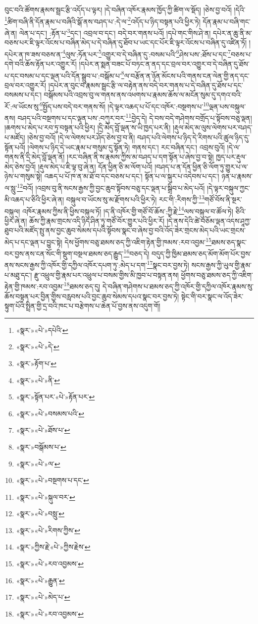 བུང་བའི་ཚོགས་རྣམས་སྦྲང་རྩི་འདོད་པ་ལྟར། །དེ་བཞིན་འཁོར་རྣམས་ཁྱོད་ཀྱི་ཚིག་ལ་སྡོད། །ཅེས་བྱ་བའོ། །དེའི་\footnote{«སྣར་»«པེ་»དཔེའི་}ཚིག་བཞི་ནི་དོན་རྣམ་པ་བཞིའི་སྒོ་ནས་བཤད་པ་:དེ་ལ་\footnote{«སྣར་»«པེ་»དེ་}འདོད་པ་ཉིད་བསྟན་པའི་ཕྱིར་ཏེ། དོན་རྣམ་པ་བཞི་གང་ཞེ་ན། ལེན་པ་དང་། :རྟོན་པ་\footnote{«སྣར་»རྟོག་པ་}དང་། འབྲལ་བ་དང་། བདེ་བར་གནས་པའོ། །དཔེ་གང་གིས་ཤེ་ན། དཔེར་ན་ཆུ་ནི་མ་བཅས་པར་ཇི་ལྟར་འོངས་པ་བཞིན་མེད་པ་དེ་བཞིན་དུ་ཐོབ་པ་ཡང་དང་པོར་ཇི་ལྟར་འོངས་པ་བཞིན་དུ་འཛིན་ཏོ། །དཔེར་ན་ཁ་ཟས་བཅས་ན་\footnote{«སྣར་»«པེ་»ནི་}ལུས་:ཏོན་པར་\footnote{«སྣར་»སྟོན་པར་«པེ་»རྟོན་པར་}འགྱུར་བ་དེ་བཞིན་དུ་:བསམ་པའི་\footnote{«སྣར་»«པེ་»བསམས་པའི་}ཤེས་པས་:ཐོས་པ་དང་\footnote{«སྣར་»«པེ་»ཐོས་པ་}བཅས་པ་དགེ་བའི་ཆོས་རྟོན་པར་འགྱུར་རོ། །དཔེར་ན་སྨན་བཟང་པོ་བཏང་ན་ནད་དང་བྲལ་བར་འགྱུར་བ་དེ་བཞིན་དུ་ཐོས་པ་དང་བསམ་པ་དང་ལྡན་པའི་དོན་སྒྲུབ་པ་:བསྒོམ་པ་\footnote{«སྣར་»བསྒོམས་པ་}ལ་བརྩོན་ན་ཉོན་མོངས་པའི་གནས་ངན་ལེན་གྱི་ནད་དང་བྲལ་བར་འགྱུར་རོ། །དཔེར་ན་བུང་བ་རྣམས་སྦྲང་རྩི་ལ་བརྟེན་ནས་བདེ་བར་གནས་པ་དེ་བཞིན་དུ་ཐོས་པ་དང་བསམས་པ་དང་། བསྒོམས་པའི་འབྲས་བུ་ལ་གནས་ནས་འཕགས་པ་རྣམས་ཆོས་ལ་མངོན་སུམ་དུ་དགའ་བའི་རོ་:ལ་ཡོངས་སུ་\footnote{«སྣར་»«པེ་»ལ་}སྤྱོད་པས་བདེ་བར་གནས་སོ། །དེ་ལྟར་འཆད་པ་པོ་དང་འཁོར་:བསྔགས་པ་\footnote{«སྣར་»«པེ་»བསྔགས་པ་དང་}ལྡན་པས་བསྐུལ་ནས། བཤད་པའི་བསྔགས་པ་དང་ལྡན་པས་:བཀུར་བར་\footnote{«སྣར་»«པེ་»སྐུལ་བར་}བྱེད་དེ། དེ་བས་བདེ་གཤེགས་བགྲོད་པ་སྟོབས་བཅུ་ལྡན། །ཆགས་པ་མེད་པ་རབ་ཏུ་བསྟན་པའི་ཕྱིར། །དྲི་མེད་བློ་ལྡན་ས་ཡི་ཁྱད་པར་ནི། །རྡུལ་མེད་མ་ལུས་ལེགས་པར་བཤད་པ་མཛོད། །ཅེས་བྱ་བའོ། །དེ་ལ་ལེགས་པར་ཤོད་ཅེས་བྱ་བ་ནི། བཤད་པའི་ལེགས་པ་ཉིད་དེ་རིགས་པའི་ཚུལ་ཉིད་དུ་སྟོན་པའོ། །ལེགས་པ་ཉིད་དེ་ཡང་རྣམ་པ་གསུམ་དུ་སྟོན་ཏེ། གནས་དང་། རང་བཞིན་དང་། འབྲས་བུའོ། །དེ་ལ་གནས་ནི་དྲི་མེད་བློ་ལྡན་ནོ། །རང་བཞིན་ནི་ས་རྣམས་ཀྱིས་མ་བཤད་པ་དག་སྟོན་པ་ཞེས་བྱ་བ་སྟེ། ཁྱད་པར་རྡུལ་མེད་ཅེས་བྱའོ། །རྡུལ་མེད་པ་ཇི་ལྟ་བུ་ཞེ་ན། དོན་ཕྱིན་ཅི་མ་ལོག་པའོ། །བཤད་པ་ན་དོན་ཕྱིན་ཅི་ལོག་ཏུ་གྱུར་པ་ལ་ཉེས་པ་གསུམ་སྟེ། འཆད་པ་པོ་ཁ་ན་མ་ཐོ་བ་དང་བཅས་པ་དང་། སྟོན་པ་ལ་སྐུར་པ་འདེབས་པ་དང་། ཉན་པ་རྣམས་ལ་སླུ་\footnote{«སྣར་»«པེ་»བསླུ་}བའོ། །འབྲས་བུ་ནི་སངས་རྒྱས་ཀྱི་བྱང་ཆུབ་སྟོབས་བཅུ་དང་ལྡན་པ་སྒྲིབ་པ་མེད་པའོ། །དེ་ལྟར་བསྐུལ་ཀྱང་མི་འཆད་པ་ཅིའི་ཕྱིར་ཞེ་ན། བསྐུལ་བ་ཡོངས་སུ་མ་རྫོགས་པའི་ཕྱིར་ཏེ། རང་གི་:རིགས་ཀྱི་\footnote{«སྣར་»«པེ་»རིགས་ཀྱིས་}གཙོ་བོས་ནི་སྔར་བསྐུལ། འཁོར་རྣམས་ཀྱིས་ནི་ཕྱིས་བསྐུལ་ཏོ། །ད་ནི་འཁོར་གྱི་གཙོ་བོ་ཆོས་:ཀྱི་རྗེ་\footnote{«སྣར་»ཀྱིས་རྗེ་«པེ་»ཀྱིས་རྗེས་}ལས་བསྐུལ་བ་ཚོལ་ཏེ། ཅིའི་ཕྱིར་ཞེ་ན། ཆོས་ཀྱི་རྣམ་གྲངས་འདི་ཉིད་ཤིན་ཏུ་གཙོ་བོར་གྱུར་པའི་ཕྱིར་རོ། །དེ་ནས་དེའི་ཚེ་བཅོམ་ལྡན་འདས་ཤཱཀྱ་ཐུབ་པའི་མཛོད་སྤུ་ནས་བྱང་ཆུབ་སེམས་དཔའི་སྟོབས་སྣང་བ་ཞེས་བྱ་བའི་འོད་ཟེར་གྲངས་མེད་པའི་ཡང་གྲངས་མེད་པ་དང་ལྡན་པ་བྱུང་སྟེ། དེས་ཕྱོགས་བཅུ་ཐམས་ཅད་ཀྱི་འཇིག་རྟེན་གྱི་ཁམས་:རབ་འབྱམ་\footnote{«སྣར་»«པེ་»རབ་འབྱམས་}ཐམས་ཅད་སྣང་བར་བྱས་ནས་ངན་སོང་གི་སྡུག་བསྔལ་ཐམས་ཅད་རྒྱུད་\footnote{«སྣར་»«པེ་»རྒྱུན་}བཅད་དེ། བདུད་ཀྱི་ཁྱིམ་ཐམས་ཅད་མོག་མོག་པོར་བྱས་ནས་སངས་རྒྱས་ཀྱི་འཁོར་གྱི་དཀྱིལ་འཁོར་དཔག་ཏུ་:མེད་པ་དག་\footnote{«སྣར་»«པེ་»མེད་པ་}སྣང་བར་བྱས་ཏེ། སངས་རྒྱས་ཀྱི་ཡུལ་གྱི་རྣམ་པ་མཐུ་དང་། རྫུ་འཕྲུལ་གྱི་རྣམ་པར་འཕྲུལ་པ་བསམ་གྱིས་མི་ཁྱབ་པ་བསྟན་ནས། ཕྱོགས་བཅུ་ཐམས་ཅད་ཀྱི་འཇིག་རྟེན་གྱི་ཁམས་:རབ་འབྱམ་\footnote{«སྣར་»«པེ་»རབ་འབྱམས་}ཐམས་ཅད་དུ། དེ་བཞིན་གཤེགས་པ་ཐམས་ཅད་ཀྱི་འཁོར་གྱི་དཀྱིལ་འཁོར་རྣམས་སུ་ཆོས་བསྟན་པར་བྱིན་གྱིས་བརླབས་པའི་བྱང་ཆུབ་སེམས་དཔའ་སྣང་བར་བྱས་ཏེ། སྟེང་གི་བར་སྣང་ལ་འོད་ཟེར་སྟུག་པོའི་སྤྲིན་གྱི་དྲ་བའི་ཁང་པ་བརྩེགས་པ་ཆེན་པོ་བྱས་ནས་འདུག་གོ། 